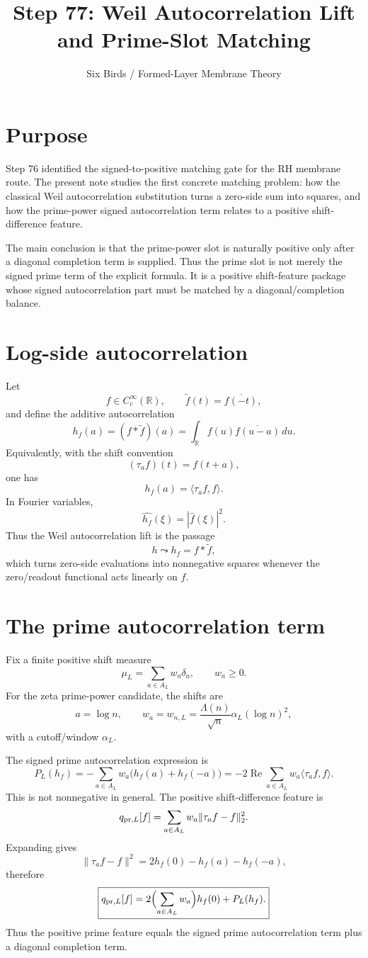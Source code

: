 \documentclass[11pt]{article}
\title{Step 77: Weil Autocorrelation Lift and Prime-Slot Matching}
\author{Six Birds / Formed-Layer Membrane Theory}
\date{}
\newcommand{\R}{\mathbb R}
\newcommand{\ip}[2]{\langle #1,#2\rangle}
\newcommand{\norm}[1]{\lVert #1\rVert}
\begin{document}
\maketitle

\section{Purpose}
Step 76 identified the signed-to-positive matching gate for the RH membrane route.  The present note studies the first concrete matching problem: how the classical Weil autocorrelation substitution turns a zero-side sum into squares, and how the prime-power signed autocorrelation term relates to a positive shift-difference feature.

The main conclusion is that the prime-power slot is naturally positive only after a diagonal completion term is supplied.  Thus the prime slot is not merely the signed prime term of the explicit formula.  It is a positive shift-feature package whose signed autocorrelation part must be matched by a diagonal/completion balance.

\section{Log-side autocorrelation}
Let
\[
  f\in C_c^\infty(\R),
  \qquad
  \widetilde f(t)=\overline{f(-t)},
\]
and define the additive autocorrelation
\[
  h_f(a)=(f*\widetilde f)(a)
       =\int_{\R} f(u)\overline{f(u-a)}\,du.
\]
Equivalently, with the shift convention
\[
  (\tau_a f)(t)=f(t+a),
\]
one has
\[
  h_f(a)=\ip{\tau_a f}{f}.
\]
In Fourier variables,
\[
  \widehat{h_f}(\xi)=|\widehat f(\xi)|^2.
\]
Thus the Weil autocorrelation lift is the passage
\[
  h\leadsto h_f=f*\widetilde f,
\]
which turns zero-side evaluations into nonnegative squares whenever the zero/readout functional acts linearly on \(f\).

\section{The prime autocorrelation term}
Fix a finite positive shift measure
\[
  \mu_L=\sum_{a\in A_L} w_a\delta_a,
  \qquad
  w_a\ge0.
\]
For the zeta prime-power candidate, the shifts are
\[
  a=\log n,
  \qquad
  w_a=w_{n,L}=\frac{\Lambda(n)}{\sqrt n}\alpha_L(\log n)^2,
\]
with a cutoff/window \(\alpha_L\).

The signed prime autocorrelation expression is
\[
  P_L(h_f)
  =-\sum_{a\in A_L}w_a\bigl(h_f(a)+h_f(-a)\bigr)
  =-2\operatorname{Re}\sum_{a\in A_L}w_a\ip{\tau_a f}{f}.
\]
This is not nonnegative in general.  The positive shift-difference feature is
\[
  q_{{\rm pr},L}[f]
  =\sum_{a\in A_L}w_a\norm{\tau_a f-f}_2^2.
\]
Expanding gives
\[
  \norm{\tau_a f-f}^2
  =2h_f(0)-h_f(a)-h_f(-a),
\]
therefore
\[
  \boxed{
  q_{{\rm pr},L}[f]
  =2\Bigl(\sum_{a\in A_L}w_a\Bigr)h_f(0)+P_L(h_f).
  }
\]
Thus the positive prime feature equals the signed prime autocorrelation term plus a diagonal completion term.
\end{document}
